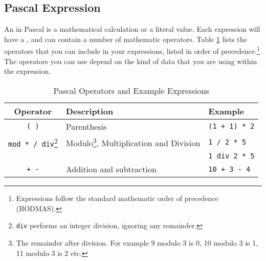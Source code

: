 \clearpage
\subsection{Pascal Expression} %
\label{sub:program-creation-pas_expression}

An  in Pascal is a mathematical calculation or a literal value. Each expression will have a , and can contain a number of mathematic operators. Table \ref{tbl:program-creation-pas operators and expresions} lists the operators that you can include in your expressions, listed in order of precedence.\footnote{Expressions follow the standard mathematic order of precedence (BODMAS).} The operators you can use depend on the kind of data that you are using within the expression.

\begin{table}[h]
  \begin{minipage}{\textwidth}
  \centering
  \begin{tabular}{|c|l|l|}
    \hline
    \textbf{Operator} & \textbf{Description} & \textbf{Example} \\
    \hline
    \texttt{ ( ) }     &   Parenthesis                 & \texttt{(1 + 1) * 2}  \\
    \texttt{mod * / div}\footnote{\texttt{div} performs an integer division, ignoring any remainder.}      &   Modulo\footnote{The remainder after division. For example 9 modulo 3 is 0, 10 modulo 3 is 1, 11 modulo 3 is 2 etc.}, Multiplication and Division & \texttt{1 / 2 * 5}  \\
     & & \texttt{1 div 2 * 5} \\
    \texttt{+ -}      &   Addition and subtraction    & \texttt{10 + 3 - 4}   \\
    \hline
  \end{tabular}
  \end{minipage}
  \caption{Pascal Operators and Example Expressions}
  \label{tbl:program-creation-pas operators and expresions}
\end{table}

